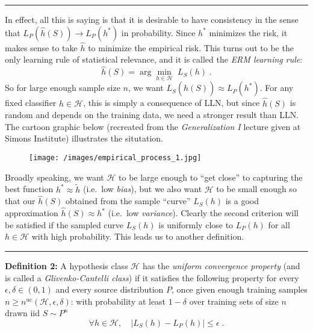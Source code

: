 \documentclass[]{article}
\begin{document}
\begin{center}\rule{0.5\linewidth}{\linethickness}\end{center}

In effect, all this is saying is that it is desirable to have
consistency in the sense that \(L_P(\hat{h}(S)) \rightarrow L_P(h^*)\)
in probability. Since \(h^*\) minimizes the risk, it makes sense to take
\(\hat{h}\) to minimize the empirical risk. This turns out to be the
only learning rule of statistical relevance, and it is called the
\emph{ERM learning rule}: \[
\hat{h}(S) = \arg\min_{h\in \mathcal{H}}\; L_S(h)\;.
\] So for large enough sample size \(n\), we want
\(L_S(\hat{h}(S)) \approx L_P(h^*)\). For any fixed classifier
\(h \in \mathcal{H}\), this is simply a consequence of LLN, but since
\(\hat{h}(S)\) is random and depends on the training data, we need a
stronger result than LLN. The cartoon graphic below (recreated from the
\emph{Generalization I} lecture given at Simons Institute) illustrates
the situtation.

\begin{figure}[htbp]
\centering
\texttt{[image: /images/empirical\_process\_1.jpg]}
\caption{}
\end{figure}

Broadly speaking, we want \(\mathcal{H}\) to be large enough to ``get
close'' to capturing the best function \(h^* \approx \tilde{h}\)
(i.e.~low \emph{bias}), but we also want \(\mathcal{H}\) to be small
enough so that our \(\hat{h}(S)\) obtained from the sample ``curve''
\(L_S(h)\) is a good approximation \(\hat{h}(S) \approx h^*\) (i.e.~low
\emph{variance}). Clearly the second criterion will be satisfied if the
sampled curve \(L_S(h)\) is uniformly close to \(L_P(h)\) for all
\(h\in \mathcal{H}\) with high probability. This leads us to another
definition.

\begin{center}\rule{0.5\linewidth}{\linethickness}\end{center}

\textbf{Definition 2:} A hypothesis class \(\mathcal{H}\) has the
\emph{uniform convergence property} (and is called a
\emph{Glivenko-Cantelli class}) if it satisfies the following property
for every \(\epsilon, \delta \in (0,1)\) and every source distribution
\(P\), once given enough training samples
\(n\ge n^{\text{uc}}(\mathcal{H}, \epsilon, \delta)\): with probability
at least \(1 - \delta\) over training sets of size \(n\) drawn iid
\(S\sim P^n\) \[
\forall h\in \mathcal{H},  \quad |L_S(h) - L_P(h)| \le \epsilon\;.
\]
\end{document}

